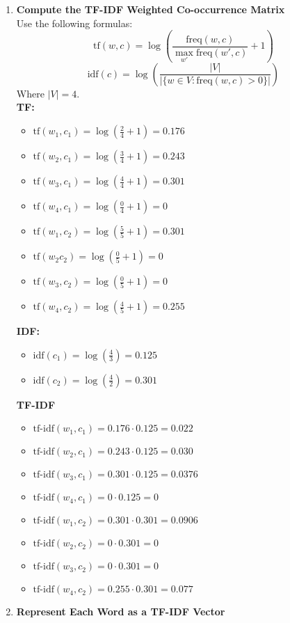 \documentclass{article}
\begin{document}
\begin{enumerate}
    \item \textbf{Compute the TF-IDF Weighted Co-occurrence Matrix} \\
    Use the following formulas:
    \[
    \text{tf}(w, c) = \log \left( \frac{\text{freq}(w, c)}{\max_{w'} \text{freq}(w', c)} + 1 \right)
    \]
    \[
    \text{idf}(c) = \log \left( \frac{|V|}{|\{w \in V : \text{freq}(w, c) > 0\}|} \right)
    \]
    Where $|V| = 4$.
\\

    \textbf{TF:}
	\begin{itemize}
	\item $ \text{tf}(w_1, c_1) = \log \left( \frac{2}{4} + 1 \right)=0.176$
	\item $ \text{tf}(w_2, c_1) = \log \left( \frac{3}{4} + 1 \right)=0.243$
	\item $ \text{tf}(w_3, c_1) = \log \left( \frac{4}{4} + 1 \right)=0.301$
	\item $ \text{tf}(w_4, c_1) = \log \left( \frac{0}{4} + 1 \right)=0$
	\item $ \text{tf}(w_1, c_2) = \log \left( \frac{5}{5} + 1 \right)=0.301$
	\item $ \text{tf}(w_2 c_2) = \log \left( \frac{0}{5} + 1 \right)=0$
	\item $ \text{tf}(w_3, c_2) = \log \left( \frac{0}{5} + 1 \right)=0$
	\item $ \text{tf}(w_4, c_2) = \log \left( \frac{4}{5} + 1 \right)=0.255$
	\end{itemize}

    \textbf{IDF:}
	\begin{itemize}
	\item $\text{idf}(c_1)=\log(\frac{4}{3})=0.125$
	\item $\text{idf}(c_2)=\log(\frac{4}{2})=0.301$
	\end{itemize}

\textbf{TF-IDF}
	\begin{itemize}
	\item $ \text{tf-idf}(w_1, c_1) = 0.176 \cdot 0.125 = 0.022$
	\item $ \text{tf-idf}(w_2, c_1) = 0.243 \cdot 0.125 = 0.030$
	\item $ \text{tf-idf}(w_3, c_1) = 0.301 \cdot 0.125 = 0.0376$
	\item $ \text{tf-idf}(w_4, c_1) = 0 \cdot 0.125 = 0$
	\item $ \text{tf-idf}(w_1, c_2) = 0.301 \cdot 0.301 = 0.0906$
	\item $ \text{tf-idf}(w_2, c_2) = 0 \cdot 0.301 = 0$
	\item $ \text{tf-idf}(w_3, c_2) = 0 \cdot 0.301 = 0$
	\item $ \text{tf-idf}(w_4, c_2) = 0.255 \cdot 0.301 = 0.077$
	\end{itemize}
    \item \textbf{Represent Each Word as a TF-IDF Vector}


\end{enumerate}
\end{document}
